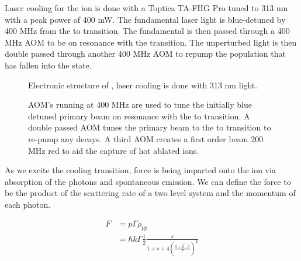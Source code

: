 Laser cooling for the  ion is done with a Toptica TA-FHG Pro tuned to 313 nm with a peak power of 400 mW. The fundamental laser light is blue-detuned by 400 MHz from the  to  transition. The fundamental is then passed through a 400 MHz AOM to be on resonance with the transition. The unperturbed light is then double passed through another 400 MHz AOM to repump the population that has fallen into the  state.

\begin{figure}[H]
	\centering
	\caption{Electronic structure of , laser cooling is done with 313 nm light.}
\end{figure}

\begin{figure}[H]
	\centering
	\caption{AOM's running at 400 MHz are used to tune the initially blue detuned primary beam on resonance with the  to  transition. A double passed AOM tunes the primary beam to the  to  transition to re-pump any  decays. A third AOM creates a first order beam 200 MHz red to aid the capture of hot ablated  ions.}
\end{figure}

As we excite the cooling transition, force is being imparted onto the ion via absorption of the photons and spontaneous emission. We can define the force to be the product of the scattering rate of a two level system and the momentum of each photon.

\begin{align}
	F & = p \Gamma \rho_{pp} \nonumber \\
	& = \hbar k \Gamma \frac{1}{2} \frac{s}{1+s+4\left(\frac{\delta-\vec{k}\cdot \vec{v}}{\Gamma}\right)^2} \label{eq: laser force}
\end{align}

